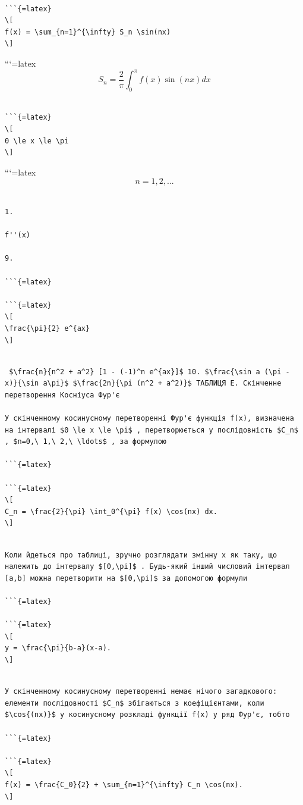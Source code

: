 \documentclass[
]{article}
\begin{document}
\begin{verbatim}

```{=latex}
\[
f(x) = \sum_{n=1}^{\infty} S_n \sin(nx)
\]
\end{verbatim}

```{=latex}
\[
S_n = \frac{2}{\pi} \int_{0}^{\pi} f(x) \sin(nx) dx
\]

\begin{verbatim}

```{=latex}
\[
0 \le x \le \pi
\]
\end{verbatim}

```{=latex}
\[
n = 1, 2, ...
\]

\begin{verbatim}

1.

f''(x)

9.

```{=latex}

```{=latex}
\[
\frac{\pi}{2} e^{ax}
\]
\end{verbatim}

\begin{verbatim}

 $\frac{n}{n^2 + a^2} [1 - (-1)^n e^{ax}]$ 10. $\frac{\sin a (\pi - x)}{\sin a\pi}$ $\frac{2n}{\pi (n^2 + a^2)}$ ТАБЛИЦЯ E. Скінченне перетворення Косніуса Фур'є

У скінченному косинусному перетворенні Фур'є функція f(x), визначена на інтервалі $0 \le x \le \pi$ , перетворюється у послідовність $C_n$ , $n=0,\ 1,\ 2,\ \ldots$ , за формулою

```{=latex}

```{=latex}
\[
C_n = \frac{2}{\pi} \int_0^{\pi} f(x) \cos(nx) dx.
\]
\end{verbatim}

\begin{verbatim}

Коли йдеться про таблиці, зручно розглядати змінну x як таку, що належить до інтервалу $[0,\pi]$ . Будь-який інший числовий інтервал [a,b] можна перетворити на $[0,\pi]$ за допомогою формули

```{=latex}

```{=latex}
\[
y = \frac{\pi}{b-a}(x-a).
\]
\end{verbatim}

\begin{verbatim}

У скінченному косинусному перетворенні немає нічого загадкового: елементи послідовності $C_n$ збігаються з коефіцієнтами, коли $\cos{(nx)}$ у косинусному розкладі функції f(x) у ряд Фур'є, тобто

```{=latex}

```{=latex}
\[
f(x) = \frac{C_0}{2} + \sum_{n=1}^{\infty} C_n \cos(nx).
\]
\end{verbatim}
\end{document}
